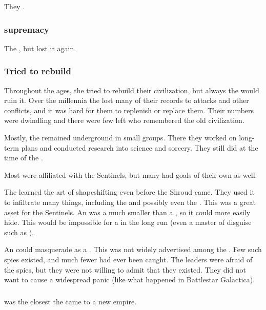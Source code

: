 They . 





\subsubsection{\QuilJaaran supremacy}
The \quiljaaran {}, but lost it again. 





\subsubsection{Tried to rebuild}
Throughout the ages, the \ophidians tried to rebuild their civilization, but always the  would ruin it.
Over the millennia the \ophidians lost many of their records to \noggyal attacks and other conflicts, and it was hard for them to replenish or replace them.
Their numbers were dwindling and there were few left who remembered the old \ophidian civilization. 

Mostly, the \ophidians remained underground in small groups.
There they worked on long-term plans and conducted research into science and sorcery. 
They still did at the time of the \thirdbanewar. 

Most \ophidians were affiliated with the Sentinels, but many had goals of their own as well.

The \ophidians learned the art of shapeshifting even before the Shroud came. 
They used it to infiltrate many things, including the \aryothim and possibly even the \resphain. 
This was a great asset for the Sentinels. 
An \ophidian was a much smaller \vertex than a \dragon, so it could more easily hide.
This would be impossible for a \dragon in the long run (even a master of disguise such as \Nzessuacrith). 

An \ophidian could masquerade as a \bezed. 
This was not widely advertised among the \resphain.
Few such spies existed, and much fewer had ever been caught. 
The \resphan leaders were afraid of the spies, but they were not willing to admit that they existed.
They did not want to cause a widespread panic (like what happened in Battlestar Galactica).





\subsubsection{\Saphyrae}
 was the closest the \ophidians came to a new empire. 





